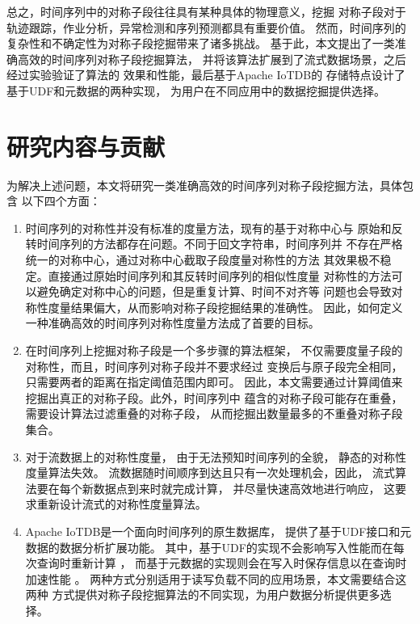 总之，时间序列中的对称子段往往具有某种具体的物理意义，挖掘
对称子段对于轨迹跟踪，作业分析，异常检测和序列预测都具有重要价值。
然而，时间序列的复杂性和不确定性为对称子段挖掘带来了诸多挑战。
基于此，本文提出了一类准确高效的时间序列对称子段挖掘算法，
并将该算法扩展到了流式数据场景，之后经过实验验证了算法的
效果和性能，最后基于Apache IoTDB\cite{10.14778/3415478.3415504}的
存储特点设计了基于UDF和元数据的两种实现，
为用户在不同应用中的数据挖掘提供选择。


\section{研究内容与贡献}
为解决上述问题，本文将研究一类准确高效的时间序列对称子段挖掘方法，具体包含
以下四个方面：
\begin{enumerate}
  \item 时间序列的对称性并没有标准的度量方法，现有的基于对称中心与
  原始和反转时间序列的方法都存在问题。不同于回文字符串，时间序列并
  不存在严格统一的对称中心，通过对称中心截取子段度量对称性的方法
  其效果极不稳定。直接通过原始时间序列和其反转时间序列的相似性度量
  对称性的方法可以避免确定对称中心的问题，但是重复计算、时间不对齐等
  问题也会导致对称性度量结果偏大，从而影响对称子段挖掘结果的准确性。
  因此，如何定义一种准确高效的时间序列对称性度量方法成了首要的目标。
  \item 在时间序列上挖掘对称子段是一个多步骤的算法框架，
  不仅需要度量子段的对称性，而且，时间序列对称子段并不要求经过
  变换后与原子段完全相同，只需要两者的距离在指定阈值范围内即可。
  因此，本文需要通过计算阈值来挖掘出真正的对称子段。此外，时间序列中
  蕴含的对称子段可能存在重叠，需要设计算法过滤重叠的对称子段，
  从而挖掘出数量最多的不重叠对称子段集合。
  \item 对于流数据上的对称性度量，
  由于无法预知时间序列的全貌，
  静态的对称性度量算法失效。
  流数据随时间顺序到达且只有一次处理机会，因此，
  流式算法要在每个新数据点到来时就完成计算，
  并尽量快速高效地进行响应，
  这要求重新设计流式的对称性度量算法。
  \item Apache IoTDB是一个面向时间序列的原生数据库，
  提供了基于UDF接口和元数据的数据分析扩展功能。
  其中，基于UDF的实现不会影响写入性能而在每次查询时重新计算
  \cite{DBLP:journals/jiis/Castro-LopezBL20}，
  而基于元数据的实现则会在写入时保存信息以在查询时加速性能
  \cite{DBLP:phd/hal/Zhang19c}。
  两种方式分别适用于读写负载不同的应用场景，本文需要结合这两种
  方式提供对称子段挖掘算法的不同实现，为用户数据分析提供更多选择。
  
\end{enumerate}

